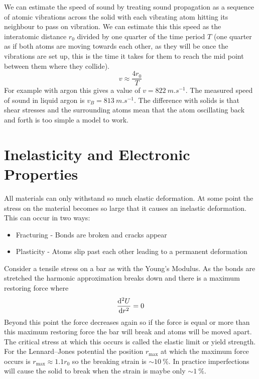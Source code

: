     We can estimate the speed of sound by treating sound propagation as a sequence of atomic vibrations across the solid with each vibrating atom hitting its neighbour to pass on vibration.
    We can estimate this this speed as the interatomic distance \(r_0\) divided by one quarter of the time period \(T\) (one quarter as if both atoms are moving towards each other, as they will be once the vibrations are set up, this is the time it takes for them to reach the mid point between them where they collide).
    \[v\approx \frac{4r_0}{T}\]
    For example with argon this gives a value of \(v = \SI{822}{m.s^{-1}}\).
    The measured speed of sound in liquid argon is \(v_B = \SI{813}{m.s^{-1}}\).
    The difference with solids is that shear stresses and the surrounding atoms mean that the atom oscillating back and forth is too simple a model to work.
    
    \section{Inelasticity and Electronic Properties}
    All materials can only withstand so much elastic deformation.
    At some point the stress on the material becomes so large that it causes an inelastic deformation.
    This can occur in two ways:
    \begin{itemize}
        \item Fracturing - Bonds are broken and cracks appear
        \item Plasticity - Atoms slip past each other leading to a permanent deformation
    \end{itemize}
    Consider a tensile stress on a bar as with the Young's Modulus.
    As the bonds are stretched the harmonic approximation breaks down and there is a maximum restoring force where
    \[\dv[2]{U}{r} = 0\]
    Beyond this point the force decreases again so if the force is equal or more than this maximum restoring force the bar will break and atoms will be moved apart.
    The critical stress at which this occurs is called the elastic limit or yield strength.
    For the Lennard--Jones potential the position \(r_\text{max}\) at which the maximum force occurs is \(r_\text{max} \approx 1.1r_0\) so the breaking strain is \(\sim\SI{10}{\%}\).
    In practice imperfections will cause the solid to break when the strain is maybe only \(\sim\SI{1}{\%}\).
    
